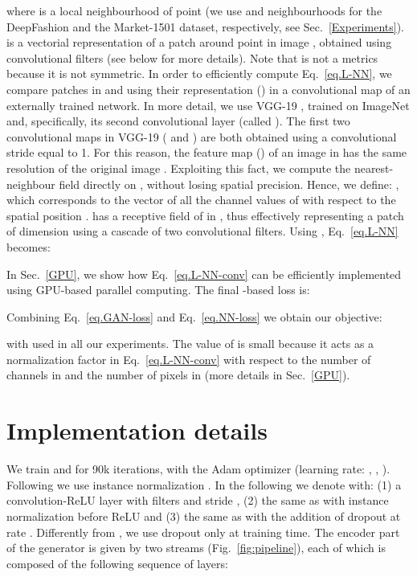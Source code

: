 \documentclass[10pt,twocolumn,letterpaper]{article}
\begin{document}
\noindent
where  is a  local 
neighbourhood of point 
(we use  and  neighbourhoods for the DeepFashion and the Market-1501 dataset, respectively, see Sec.~\ref{Experiments}).
 is a vectorial representation of a patch around point  in image , obtained using convolutional filters (see below for more details).
Note that  is not a metrics because it is not symmetric. 
In order to efficiently compute Eq.~\ref{eq.L-NN}, we compare patches in  and  using their representation
() in a  
convolutional map of an externally trained network.
In more detail, we use VGG-19 \cite{DBLP:journals/corr/SimonyanZ14a}, trained on ImageNet  and, specifically, its second convolutional layer (called ). The first two convolutional maps in VGG-19 ( and  ) are both obtained using a convolutional stride equal to 1. For this reason, the feature map () of an image  in   has the same resolution of the original image . Exploiting this fact, we compute the nearest-neighbour field directly on  , without losing spatial precision. 
Hence, we define: , which corresponds to the vector of all the channel values of  with respect to the spatial position .  has a receptive field of  in , thus effectively representing a patch of dimension  using a cascade of two convolutional filters. Using , Eq.~\ref{eq.L-NN} becomes:




\noindent
 In Sec.~\ref{GPU},
 we show how Eq.~\ref{eq.L-NN-conv} can be efficiently implemented 
  using GPU-based parallel computing.
   The final -based loss is:




Combining Eq.~\ref{eq.GAN-loss} and Eq.~\ref{eq.NN-loss} we obtain our  objective:



\noindent
with  used
 in all our experiments. The value of  is small because it acts as a normalization factor in  Eq.~\ref{eq.L-NN-conv} with respect to the number of channels in  and the number of pixels in   (more details in  Sec.~\ref{GPU}).


\section{Implementation details}
\label{sec:impDetails}
We train  and  for 90k iterations, with the Adam optimizer (learning rate: , , ). Following \cite{pix2pix2016} we use instance normalization \cite{DBLP:journals/corr/UlyanovVL16}. 
In the following we denote with: 
(1)   a convolution-ReLU layer with  filters and stride ,
(2)    the same as  with instance normalization before ReLU and
(3)  the same as   with the addition of  dropout at rate .
Differently from \cite{pix2pix2016}, we use dropout only at training time.
The encoder part of the generator is given by two streams (Fig.~\ref{fig:pipeline}), each of which is composed of the following sequence of layers:
\end{document}
